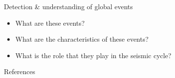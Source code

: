 \documentclass[aspectratio=43,9pt]{beamer}
\newcommand\dirbiblio{../biblio/}
\begin{document}
\begin{frame}{Detection \& understanding of global events}

\begin{itemize}
 \item What are these events? \\
 \vskip 0.5cm
 \item What are the characteristics of these events?  \\
 \vskip 0.5cm
 \item What is the role that they play in the seismic cycle?
\end{itemize}


\end{frame}




\begin{frame}[allowframebreaks]{References}

    \nocite{Frank_2016_AMF,Beauce_2017_FMF}
    
        

\end{frame}
\end{document}
